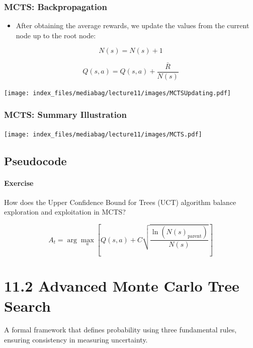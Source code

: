 \documentclass[
  letterpaper,
  DIV=11,
  numbers=noendperiod]{scrreprt}
\providecommand{\tightlist}{%
  \setlength{\itemsep}{0pt}\setlength{\parskip}{0pt}}\usepackage{longtable,booktabs,array}
\begin{document}
\subsection{MCTS: Backpropagation}\label{mcts-backpropagation}

\begin{itemize}
\tightlist
\item
  After obtaining the average rewards, we update the values from the
  current node up to the root node:
\end{itemize}

\[
N(s) = N(s) + 1
\]

\[
Q(s,a) = Q(s,a) + \frac{\bar{R}}{N(s)}
\]

\texttt{[image: index\_files/mediabag/lecture11/images/MCTSUpdating.pdf]}

\subsection{MCTS: Summary Illustration}\label{mcts-summary-illustration}

\texttt{[image: index\_files/mediabag/lecture11/images/MCTS.pdf]}

\section{Pseudocode}\label{pseudocode-16}

\subsubsection{\texorpdfstring{ Exercise
}{ Exercise }}\label{exercise-17}

How does the Upper Confidence Bound for Trees (UCT) algorithm balance
exploration and exploitation in MCTS?

\[
A_t = \arg\max_a \left[ Q(s,a) + C \sqrt{\frac{\ln(N(s)_{\text{parent}})}{N(s)}} \right]
\]

\chapter{11.2 Advanced Monte Carlo Tree
Search}\label{advanced-monte-carlo-tree-search}

\begin{tcolorbox}[enhanced jigsaw, arc=.35mm, toprule=.15mm, leftrule=.75mm, colback=white, left=2mm, colframe=quarto-callout-note-color-frame, rightrule=.15mm, opacityback=0, breakable, bottomrule=.15mm]

A formal framework that defines probability using three fundamental
rules, ensuring consistency in measuring uncertainty. 🎲

\end{tcolorbox}
\end{document}
